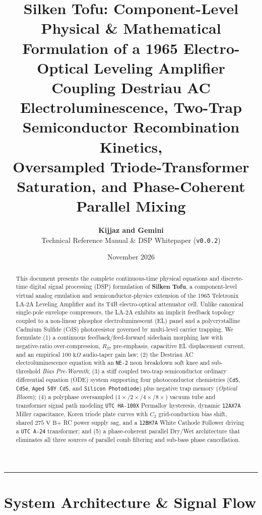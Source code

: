 \documentclass[11pt,a4paper]{article}
\title{
    \vspace{-1.0cm}
    \textbf{\LARGE Silken Tofu: Component-Level Physical \& Mathematical Formulation of a 1965 Electro-Optical Leveling Amplifier}\\[0.5em]
    \large Coupling Destriau AC Electroluminescence, Two-Trap Semiconductor Recombination Kinetics,\\
    Oversampled Triode-Transformer Saturation, and Phase-Coherent Parallel Mixing
}
\author{
    \textbf{Kijjaz and Gemini}\\
    \small Technical Reference Manual \& DSP Whitepaper (\texttt{v0.0.2})
}
\date{November 2026}
\begin{document}
\maketitle

\begin{abstract}
\noindent
This document presents the complete continuous-time physical equations and discrete-time digital signal processing (DSP) formulation of \textbf{Silken Tofu}, a component-level virtual analog emulation and semiconductor-physics extension of the 1965 Teletronix LA-2A Leveling Amplifier and its T4B electro-optical attenuator cell. Unlike canonical single-pole envelope compressors, the LA-2A exhibits an implicit feedback topology coupled to a non-linear phosphor electroluminescent (EL) panel and a polycrystalline Cadmium Sulfide (CdS) photoresistor governed by multi-level carrier trapping. We formulate (1) a continuous feedback/feed-forward sidechain morphing law with negative-ratio over-compression, $R_{37}$ pre-emphasis, capacitive EL displacement current, and an empirical $100\text{ k}\Omega$ audio-taper gain law; (2) the Destriau AC electroluminescence equation with an \texttt{NE-2} neon breakdown soft knee and sub-threshold \emph{Bias Pre-Warmth}; (3) a stiff coupled two-trap semiconductor ordinary differential equation (ODE) system supporting four photoconductor chemistries (\texttt{CdS}, \texttt{CdSe}, \texttt{Aged 50Y CdS}, and \texttt{Silicon Photodiode}) plus negative trap memory (\emph{Optical Bloom}); (4) a polyphase oversampled ($1\times/2\times/4\times/8\times$) vacuum tube and transformer signal path modeling \texttt{UTC HA-100X} Permalloy hysteresis, dynamic \texttt{12AX7A} Miller capacitance, Koren triode plate curves with $C_2$ grid-conduction bias shift, shared $275\text{ V B+}$ RC power supply sag, and a \texttt{12BH7A} White Cathode Follower driving a \texttt{UTC A-24} transformer; and (5) a phase-coherent parallel Dry/Wet architecture that eliminates all three sources of parallel comb filtering and sub-bass phase cancellation.
\end{abstract}

\tableofcontents
\vspace{0.8em}
\hrule
\vspace{1.2em}

\section{System Architecture \& Signal Flow}
\end{document}
